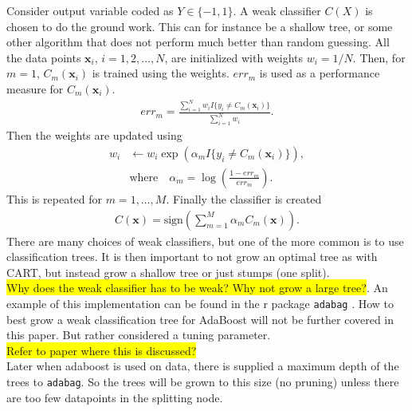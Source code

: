 Consider output variable coded as $Y \in \{-1, 1\}$. A weak classifier $C(X)$ is chosen to do the ground work. This can for instance be a shallow tree, or some other algorithm that does not perform much better than random guessing. All the data points $\mathbf{x}_i$, $i = 1, 2, \ldots, N$, are initialized with weights $w_i = 1/N$. Then, for $m = 1$, $C_m(\mathbf{x}_i)$ is trained using the weights. $err_m$ is used as a performance measure for $C_m(\mathbf{x}_i)$.
\begin{align}
  err_m =  \frac{\sum^{N}_{i=1} w_i I\{y_i \neq C_m(\mathbf{x}_i)\}}{\sum^{N}_{i=1} w_i}.
\end{align}
Then the weights are updated using 
\begin{align}
  w_i &\leftarrow w_i \exp\left( \alpha_m I\{y_i \neq C_m(\mathbf{x}_i)\} \right), \\
  &\text{where} \quad \alpha_m = \log\left(  \frac{1-err_m}{err_m} \right).
\end{align}
This is repeated for $m = 1, \ldots, M$. Finally the classifier is created
\begin{align}
  C( \mathbf{x}) = \text{sign}\left( \sum^{M}_{m=1} \alpha_m C_m(\mathbf{x}) \right).
\end{align}
There are many choices of weak classifiers, but one of the more common is to use classification trees. It is then important to not grow an optimal tree as with CART, but instead grow a shallow tree or just stumps (one split).
\\ \colorbox{yellow}{Why does the weak classifier has to be weak? Why not grow a large tree?}. An example of this implementation can be found in the r package \verb+adabag+ \cite{adabag}. How to best grow a weak classification tree for AdaBoost will not be further covered in this paper. But rather considered a tuning parameter.
\\\colorbox{yellow}{Refer to paper where this is discussed?}\\
Later when adaboost is used on data, there is supplied a maximum depth of the trees to \verb+adabag+. So the trees will be grown to this size (no pruning) unless there are too few datapoints in the splitting node.

